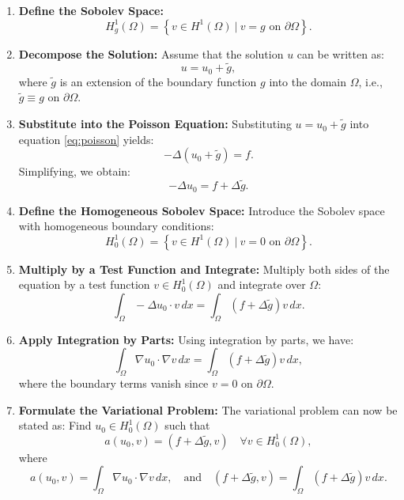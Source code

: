 \documentclass[class=article, crop=false]{standalone}
\begin{document}
\begin{enumerate}
    \item \textbf{Define the Sobolev Space:}
    $$
    H^1_g(\Omega) = \left\{ v \in H^1(\Omega) \ \bigg| \ v = g \text{ on } \partial\Omega \right\}.
    $$
    
    \item \textbf{Decompose the Solution:}
    Assume that the solution $u$ can be written as:
    $$
    u = u_0 + \tilde{g},
    $$
    where $\tilde{g}$ is an extension of the boundary function $g$ into the domain $\Omega$, i.e., $\tilde{g} \equiv g$ on $\partial\Omega$.

    \item \textbf{Substitute into the Poisson Equation:}
    Substituting $u = u_0 + \tilde{g}$ into equation \eqref{eq:poisson} yields:
    $$
    -\Delta (u_0 + \tilde{g}) = f.
    $$
    Simplifying, we obtain:
    $$
    -\Delta u_0 = f + \Delta \tilde{g}.
    $$
    
    \item \textbf{Define the Homogeneous Sobolev Space:}
    Introduce the Sobolev space with homogeneous boundary conditions:
    $$
    H^1_0(\Omega) = \left\{ v \in H^1(\Omega) \ \bigg| \ v = 0 \text{ on } \partial\Omega \right\}.
    $$
    
    \item \textbf{Multiply by a Test Function and Integrate:}
    Multiply both sides of the equation by a test function $v \in H^1_0(\Omega)$ and integrate over $\Omega$:
    $$
    \int_{\Omega} -\Delta u_0 \cdot v \, dx = \int_{\Omega} \left( f + \Delta \tilde{g} \right) v \, dx.
    $$
    
    \item \textbf{Apply Integration by Parts:}
    Using integration by parts, we have:
    $$
    \int_{\Omega} \nabla u_0 \cdot \nabla v \, dx = \int_{\Omega} \left( f + \Delta \tilde{g} \right) v \, dx,
    $$
    where the boundary terms vanish since $v = 0$ on $\partial\Omega$.
    
    \item \textbf{Formulate the Variational Problem:}
    The variational problem can now be stated as: Find $u_0 \in H^1_0(\Omega)$ such that
    \begin{equation}
        a(u_0, v) = (f + \Delta \tilde{g}, v) \quad \forall v \in H^1_0(\Omega),
        \label{eq:variational}
    \end{equation}
    where
    $$
    a(u_0, v) = \int_{\Omega} \nabla u_0 \cdot \nabla v \, dx, \quad \text{and} \quad 
    (f + \Delta \tilde{g}, v) = \int_{\Omega} (f + \Delta \tilde{g}) v \, dx.
    $$
\end{enumerate}
\end{document}
